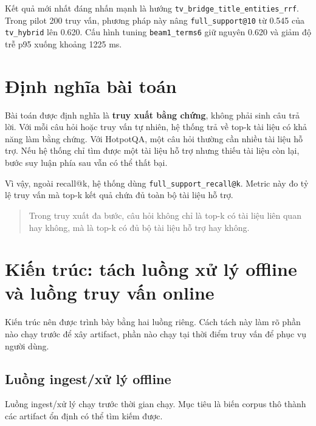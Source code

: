 \documentclass[11pt,a4paper]{article}
\newcommand{\method}[1]{\texttt{#1}}
\newcommand{\metric}[1]{\texttt{#1}}
\begin{document}
Kết quả mới nhất đáng nhấn mạnh là hướng \method{tv\_bridge\_title\_entities\_rrf}.
Trong pilot 200 truy vấn, phương pháp này nâng \metric{full\_support@10} từ 0.545 của
\method{tv\_hybrid} lên 0.620. Cấu hình tuning \texttt{beam1\_terms6} giữ nguyên
0.620 và giảm độ trễ p95 xuống khoảng 1225 ms.

\section{Định nghĩa bài toán}

Bài toán được định nghĩa là \textbf{truy xuất bằng chứng}, không phải sinh câu trả lời.
Với mỗi câu hỏi hoặc truy vấn tự nhiên, hệ thống trả về top-k tài liệu có khả năng làm
bằng chứng. Với HotpotQA, một câu hỏi thường cần nhiều tài liệu hỗ trợ. Nếu hệ thống chỉ
tìm được một tài liệu hỗ trợ nhưng thiếu tài liệu còn lại, bước suy luận phía sau vẫn có thể thất bại.

Vì vậy, ngoài recall@k, hệ thống dùng \metric{full\_support\_recall@k}. Metric này đo tỷ lệ
truy vấn mà top-k kết quả chứa đủ toàn bộ tài liệu hỗ trợ.

\begin{quote}
Trong truy xuất đa bước, câu hỏi không chỉ là top-k có tài liệu liên quan hay không,
mà là top-k có đủ bộ tài liệu hỗ trợ hay không.
\end{quote}

\section{Kiến trúc: tách luồng xử lý offline và luồng truy vấn online}

Kiến trúc nên được trình bày bằng hai luồng riêng. Cách tách này làm rõ phần nào chạy
trước để xây artifact, phần nào chạy tại thời điểm truy vấn để phục vụ người dùng.

\subsection{Luồng ingest/xử lý offline}

Luồng ingest/xử lý chạy trước thời gian chạy. Mục tiêu là biến corpus thô thành các artifact ổn định
có thể tìm kiếm được.

\begin{center}
\end{center}
\end{document}
